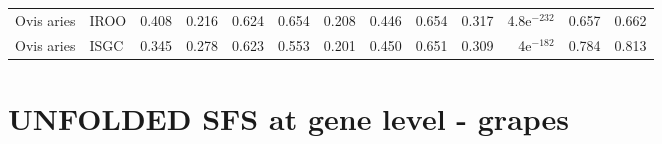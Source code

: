 \begin{longtable}{llrrrrrrrrrrr}
          Ovis aries &                      IROO &                              0.408 &                               0.216 &                 0.624 &                 0.654 &                              0.208 &                               0.446 &                 0.654 &                 0.317 & 4.8e$^{-232}$ &  0.657 &  0.662 \\
          Ovis aries &                      ISGC &                              0.345 &                               0.278 &                 0.623 &                 0.553 &                              0.201 &                               0.450 &                 0.651 &                 0.309 &   4e$^{-182}$ &  0.784 &  0.813 \\
\end{longtable}
\newpage\section*{UNFOLDED SFS at gene level - grapes} 
